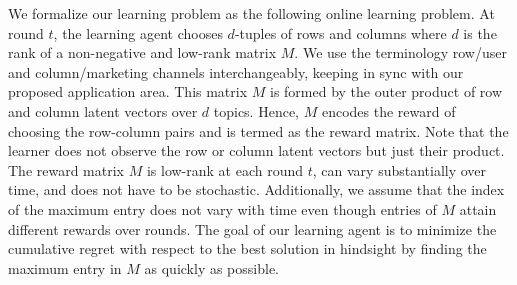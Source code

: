 We formalize our learning problem as the following online learning problem. At round $t$, the learning agent chooses $d$-tuples of rows and columns where $d$ is the rank of a non-negative and low-rank matrix $M$. We use the terminology row/user and column/marketing channels interchangeably, keeping in sync with our proposed application area. This matrix $M$ is formed by the outer product of row and column latent vectors over $d$ topics. Hence, $M$ encodes the reward of choosing the row-column pairs and is termed as the reward matrix. Note that the learner does not observe the row or column  latent vectors  but just their product. The reward matrix $M$ is low-rank at each round $t$, can vary substantially over time, and does not have to be stochastic. Additionally, we assume that the index of the maximum entry does not vary with time even though entries of $M$ attain different rewards over rounds. The goal of our learning agent is to minimize the cumulative regret with respect to the best solution in hindsight by finding the maximum entry in $M$ as quickly as possible.



